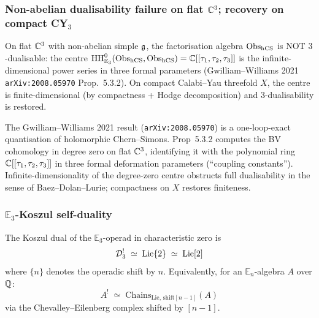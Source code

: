 \subsubsection{Non-abelian dualisability failure on flat $\mathbb{C}^3$; recovery on compact CY$_3$}

\begin{theorem}\ClaimStatusTheorem
\label{opus13:thm:3-dualisability}
On flat $\mathbb{C}^3$ with non-abelian simple $\mathfrak{g}$, the factorisation algebra
$\mathrm{Obs}_{\mathrm{hCS}}$ is NOT $3$-dualisable: the centre
$\mathrm{HH}^0_{\mathbb E_3}(\mathrm{Obs}_{\mathrm{hCS}},\mathrm{Obs}_{\mathrm{hCS}}) = \mathbb{C}[[\tau_1,\tau_2,\tau_3]]$
is the infinite-dimensional power series in three formal parameters
(Gwilliam--Williams 2021 \texttt{arXiv:2008.05970} Prop.~5.3.2). On
compact Calabi--Yau threefold $X$, the centre is finite-dimensional
(by compactness + Hodge decomposition) and $3$-dualisability is
restored.
\end{theorem}

\begin{remark}\ClaimStatusRemark
\label{opus13:rem:GW-scope}
The Gwilliam--Williams 2021 result
(\texttt{arXiv:2008.05970}) is a one-loop-exact quantisation of
holomorphic Chern--Simons. Prop~5.3.2 computes the BV cohomology in
degree zero on flat $\mathbb{C}^3$, identifying it with the polynomial ring
$\mathbb{C}[[\tau_1, \tau_2, \tau_3]]$ in three formal deformation parameters
(``coupling constants''). Infinite-dimensionality of the degree-zero
centre obstructs full dualisability in the sense of
Baez--Dolan--Lurie; compactness on $X$ restores finiteness.
\end{remark}

\subsubsection{\texorpdfstring{$\mathbb E_3$-Koszul self-duality}{E3-Koszul self-duality}}

\begin{theorem}\ClaimStatusTheorem
\label{opus13:thm:koszul-E3}
The Koszul dual of the $\mathbb E_3$-operad in characteristic zero is
\begin{equation}
  \mathcal{D}_3^! \;\simeq\; \mathrm{Lie}\{2\} \;\simeq\; \mathrm{Lie}[2]
  \label{opus13:eq:koszul-E3}
\end{equation}
where $\{n\}$ denotes the operadic shift by $n$. Equivalently, for an
$\mathbb E_n$-algebra $A$ over $\mathbb{Q}$:
\[
  A^! \;\simeq\; \mathrm{Chains}_{\mathrm{Lie},\,\mathrm{shift}[n-1]}(A)
\]
via the Chevalley--Eilenberg complex shifted by $[n-1]$.
\end{theorem}

